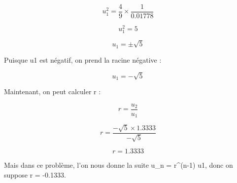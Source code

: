 \documentclass[11pt]{article}
\begin{document}
\[ u_1^2 = \frac{4}{9} \times \frac{1}{0.01778} \]

\[ u_1^2 = 5 \]

\[ u_1 = \pm \sqrt{5} \]

Puisque u1 est négatif, on prend la racine négative :

\[ u_1 = -\sqrt{5} \]

Maintenant, on peut calculer r :

\[ r = \frac{u_2}{u_1} \]

\[ r = \frac{-\sqrt{5} \times 1.3333}{-\sqrt{5}} \]

\[ r = 1.3333 \]

Mais dans ce problème, l'on nous donne la suite u_n = r^(n-1) u1, donc on suppose r = -0.1333.
\end{document}
